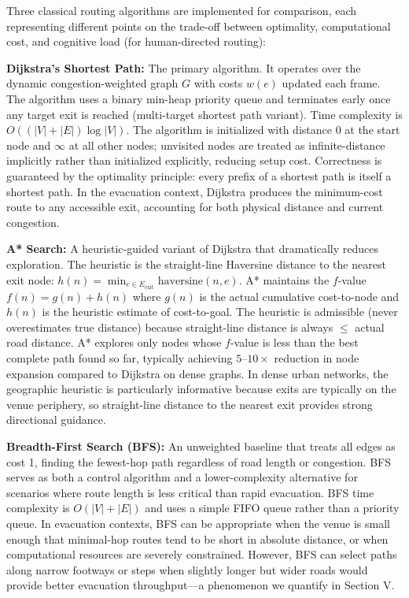 \documentclass[conference]{IEEEtran}
\begin{document}
Three classical routing algorithms are implemented for comparison, each representing different points on the trade-off between optimality, computational cost, and cognitive load (for human-directed routing):

\textbf{Dijkstra's Shortest Path:} The primary algorithm. It operates over the dynamic congestion-weighted graph $G$ with costs $w(e)$ updated each frame. The algorithm uses a binary min-heap priority queue and terminates early once any target exit is reached (multi-target shortest path variant). Time complexity is $O((|V| + |E|) \log |V|)$. The algorithm is initialized with distance 0 at the start node and $\infty$ at all other nodes; unvisited nodes are treated as infinite-distance implicitly rather than initialized explicitly, reducing setup cost. Correctness is guaranteed by the optimality principle: every prefix of a shortest path is itself a shortest path. In the evacuation context, Dijkstra produces the minimum-cost route to any accessible exit, accounting for both physical distance and current congestion.

\textbf{A* Search:} A heuristic-guided variant of Dijkstra that dramatically reduces exploration. The heuristic is the straight-line Haversine distance to the nearest exit node: $h(n) = \min_{e \in E_{\text{exit}}} \text{haversine}(n, e)$. A* maintains the $f$-value $f(n) = g(n) + h(n)$ where $g(n)$ is the actual cumulative cost-to-node and $h(n)$ is the heuristic estimate of cost-to-goal. The heuristic is admissible (never overestimates true distance) because straight-line distance is always $\leq$ actual road distance. A* explores only nodes whose $f$-value is less than the best complete path found so far, typically achieving $5$–$10\times$ reduction in node expansion compared to Dijkstra on dense graphs. In dense urban networks, the geographic heuristic is particularly informative because exits are typically on the venue periphery, so straight-line distance to the nearest exit provides strong directional guidance.

\textbf{Breadth-First Search (BFS):} An unweighted baseline that treats all edges as cost 1, finding the fewest-hop path regardless of road length or congestion. BFS serves as both a control algorithm and a lower-complexity alternative for scenarios where route length is less critical than rapid evacuation. BFS time complexity is $O(|V| + |E|)$ and uses a simple FIFO queue rather than a priority queue. In evacuation contexts, BFS can be appropriate when the venue is small enough that minimal-hop routes tend to be short in absolute distance, or when computational resources are severely constrained. However, BFS can select paths along narrow footways or steps when slightly longer but wider roads would provide better evacuation throughput—a phenomenon we quantify in Section V.
\end{document}
